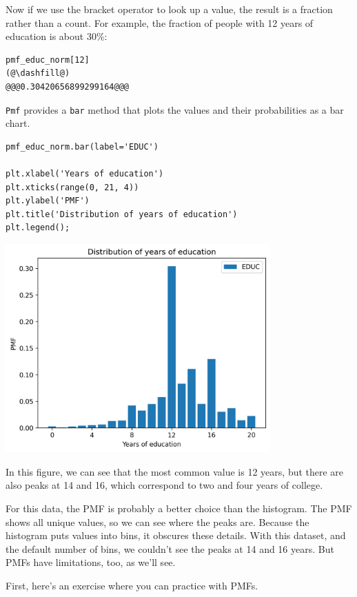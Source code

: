 Now if we use the bracket operator to look up a value, the result is a
fraction rather than a count. For example, the fraction of people with
12 years of education is about 30\%:

\begin{lstlisting}[]
pmf_educ_norm[12]
(@\dashfill@)
@@@0.30420656899299164@@@
\end{lstlisting}

\passthrough{\lstinline!Pmf!} provides a \passthrough{\lstinline!bar!}
method that plots the values and their probabilities as a bar chart.

\begin{lstlisting}[]
pmf_educ_norm.bar(label='EDUC')

plt.xlabel('Years of education')
plt.xticks(range(0, 21, 4))
plt.ylabel('PMF')
plt.title('Distribution of years of education')
plt.legend();
\end{lstlisting}

\begin{center}
\includegraphics[width=4in]{chapters/08_distributions_files/08_distributions_48_0.png}
\end{center}

In this figure, we can see that the most common value is 12 years, but
there are also peaks at 14 and 16, which correspond to two and four
years of college.

For this data, the PMF is probably a better choice than the histogram.
The PMF shows all unique values, so we can see where the peaks are.
Because the histogram puts values into bins, it obscures these details.
With this dataset, and the default number of bins, we couldn't see the
peaks at 14 and 16 years. But PMFs have limitations, too, as we'll see.

First, here's an exercise where you can practice with PMFs.

